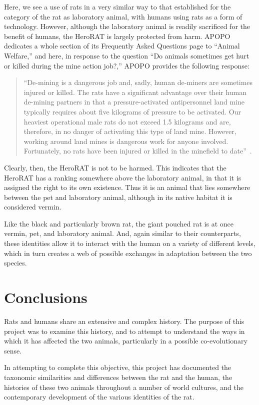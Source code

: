 \documentclass[12pt]{article}
\begin{document}
Here, we see a use of rats in a very similar way to that established for the category of the rat as laboratory animal, with humans using rats as a form of technology. However, although the laboratory animal is readily sacrificed for the benefit of humans, the HeroRAT is largely protected from harm. APOPO dedicates a whole section of its Frequently Asked Questions page to ``Animal Welfare,'' and here, in response to the question ``Do animals sometimes get hurt or killed during the mine action job?,'' APOPO provides the following response:

\begin{quote}
``De-mining is a dangerous job and, sadly, human de-miners are sometimes injured or killed. The rats have a significant advantage over their human de-mining partners in that a pressure-activated antipersonnel land mine typically requires about five kilograms of pressure to be activated. Our heaviest operational male rats do not exceed 1.5 kilograms and are, therefore, in no danger of activating this type of land mine. However, working around land mines is dangerous work for anyone involved. Fortunately, no rats have been injured or killed in the minefield to date''~\cite{APOPO}.
\end{quote}

Clearly, then, the HeroRAT is not to be harmed. This indicates that the HeroRAT has a ranking somewhere above the laboratory animal, in that it is assigned the right to its own existence. Thus it is an animal that lies somewhere between the pet and laboratory animal, although in its native habitat it is considered vermin.

Like the black and particularly brown rat, the giant pouched rat is at once vermin, pet, and laboratory animal. And, again similar to their counterparts, these identities allow it to interact with the human on a variety of different levels, which in turn creates a web of possible exchanges in adaptation between the two species.

\section{Conclusions} \label{Conclusions}

Rats and humans share an extensive and complex history. The purpose of this project was to examine this history, and to attempt to understand the ways in which it has affected the two animals, particularly in a possible co-evolutionary sense.

In attempting to complete this objective, this project has documented the taxonomic similarities and differences between the rat and the human, the histories of these two animals throughout a number of world cultures, and the contemporary development of the various identities of the rat.
\end{document}
